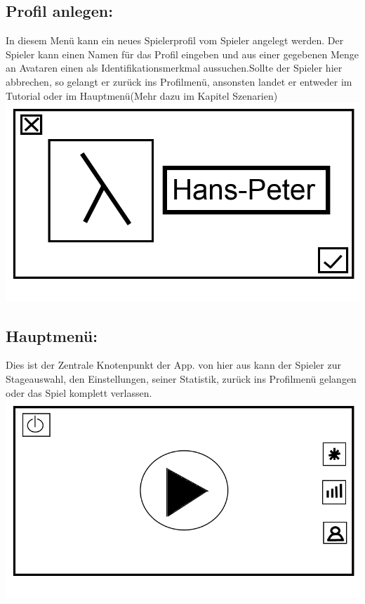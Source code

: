 \documentclass{scrartcl}
\begin{document}
\begin{enumerate}
	\begin{minipage}{1\textwidth}
		\item \subsection*{Profil anlegen:}
		In diesem Menü kann ein neues Spielerprofil vom Spieler angelegt werden. Der Spieler kann einen Namen für das Profil eingeben und aus einer gegebenen Menge an Avataren einen als Identifikationsmerkmal aussuchen.Sollte der Spieler hier abbrechen, so gelangt er zurück ins Profilmenü, ansonsten landet er entweder im Tutorial oder im Hauptmenü(Mehr dazu im Kapitel Szenarien)\\
		\includegraphics[width=\textwidth, height=7.5cm]{assets/CreateProfile}
	\end{minipage}
	
	\begin{minipage}{1\textwidth}
		\item \subsection*{Hauptmenü:} \label{appaufbau:Hauptmenü}
		Dies ist der Zentrale Knotenpunkt der App. von hier aus kann der Spieler zur Stageauswahl, den Einstellungen, seiner Statistik, zurück ins Profilmenü gelangen oder das Spiel komplett verlassen.\\
		\includegraphics[width=\textwidth, height=7.5cm]{assets/Mainmenu}
	\end{minipage}
	

\end{enumerate}
\end{document}
